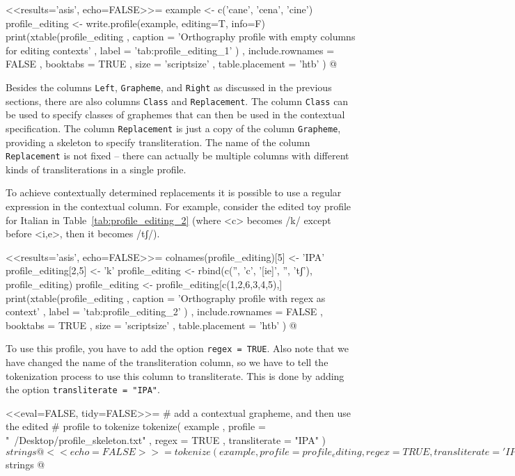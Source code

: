 <<results='asis', echo=FALSE>>=
example <- c('cane', 'cena', 'cine')
profile_editing <- write.profile(example, editing=T, info=F)
print(xtable(profile_editing
        , caption = 'Orthography profile with empty columns for editing contexts'
        , label = 'tab:profile_editing_1'
        )
  , include.rownames = FALSE
  , booktabs = TRUE
  , size = 'scriptsize'
  , table.placement = 'htb'
  )
@

Besides the columns \texttt{Left}, \texttt{Grapheme}, and \texttt{Right} as
discussed in the previous sections, there are also columns \texttt{Class} and
\texttt{Replacement}. The column \texttt{Class} can be used to specify classes
of graphemes that can then be used in the contextual specification. The column
\texttt{Replacement} is just a copy of the column \texttt{Grapheme}, providing a
skeleton to specify transliteration. The name of the column
\texttt{Replacement} is not fixed -- there can actually be multiple columns with 
different kinds of transliterations in a single profile.

To achieve contextually determined replacements it is possible to use a regular
expression in the contextual column. For example, consider the edited toy
profile for Italian in Table~\ref{tab:profile_editing_2} (where <c> becomes /k/
except before <i,e>, then it becomes /tʃ/). 

<<results='asis', echo=FALSE>>=
colnames(profile_editing)[5] <- 'IPA'
profile_editing[2,5] <- 'k'
profile_editing <- rbind(c('', 'c', '[ie]', '', 'tʃ'), profile_editing)
profile_editing <- profile_editing[c(1,2,6,3,4,5),]
print(xtable(profile_editing
        , caption = 'Orthography profile with regex as context'
        , label = 'tab:profile_editing_2'
        )
  , include.rownames = FALSE
  , booktabs = TRUE
  , size = 'scriptsize'
  , table.placement = 'htb'
  )
@

To use this profile, you have to add the option \texttt{regex = TRUE}. Also note
that we have changed the name of the transliteration column, so we have to tell
the tokenization process to use this column to transliterate. This is done by
adding the option \texttt{transliterate = "IPA"}.

<<eval=FALSE, tidy=FALSE>>=
# add a contextual grapheme, and then use the edited 
# profile to tokenize
tokenize( example
         , profile = "~/Desktop/profile_skeleton.txt"
         , regex = TRUE
         , transliterate = "IPA"
        )$strings
@

<<echo=FALSE>>=
tokenize(example
  , profile = profile_editing
  , regex = TRUE
  , transliterate = 'IPA'
  )$strings
@

